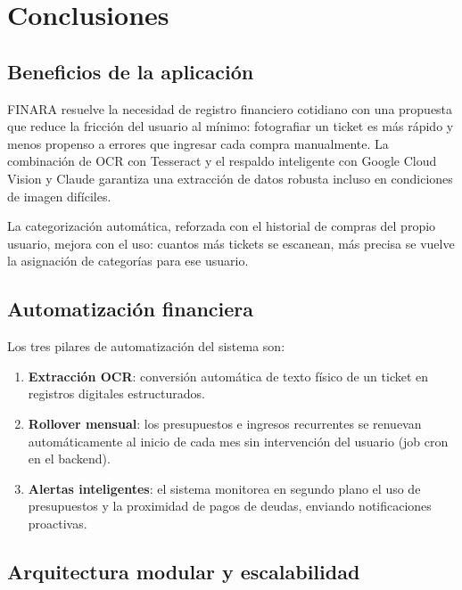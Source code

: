 \documentclass[12pt, letterpaper]{article}
\begin{document}
\section{Conclusiones}

\subsection{Beneficios de la aplicación}

FINARA resuelve la necesidad de registro financiero cotidiano con una
propuesta que reduce la fricción del usuario al mínimo: fotografiar un
ticket es más rápido y menos propenso a errores que ingresar cada compra
manualmente. La combinación de OCR con Tesseract y el respaldo inteligente
con Google Cloud Vision y Claude garantiza una extracción de datos robusta
incluso en condiciones de imagen difíciles.

La categorización automática, reforzada con el historial de compras del
propio usuario, mejora con el uso: cuantos más tickets se escanean, más
precisa se vuelve la asignación de categorías para ese usuario.

\subsection{Automatización financiera}

Los tres pilares de automatización del sistema son:

\begin{enumerate}
  \item \textbf{Extracción OCR}: conversión automática de texto físico de
        un ticket en registros digitales estructurados.
  \item \textbf{Rollover mensual}: los presupuestos e ingresos recurrentes
        se renuevan automáticamente al inicio de cada mes sin intervención
        del usuario (job cron en el backend).
  \item \textbf{Alertas inteligentes}: el sistema monitorea en segundo plano
        el uso de presupuestos y la proximidad de pagos de deudas, enviando
        notificaciones proactivas.
\end{enumerate}

\subsection{Arquitectura modular y escalabilidad}
\end{document}
